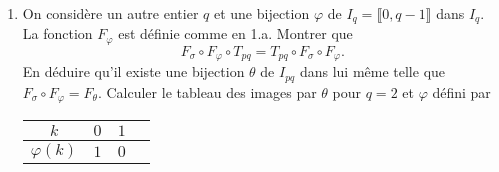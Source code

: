 \begin{enumerate}
\item On considère un autre entier $q$ et une bijection $\varphi$ de $I_q= \llbracket 0, q-1 \rrbracket$ dans $I_q$. La fonction $F_\varphi$ est définie comme en 1.a. Montrer que 
\begin{displaymath}
 F_\sigma \circ F_\varphi \circ T_{pq} = T_{pq} \circ F_\sigma \circ F_\varphi. 
\end{displaymath}
En déduire qu'il existe une bijection $\theta$ de $I_{pq}$ dans lui même telle que $F_\sigma \circ F_\varphi = F_\theta$.\newline
Calculer le tableau des images par $\theta$ pour $q=2$ et $\varphi$ défini par 
\bigskip
\begin{center} \renewcommand{\arraystretch}{1.2}
\begin{tabular}{|c|c|c|c|} \hline
$k$          & $0$ & $1$  \\  \hline
$\varphi(k)$ & $1$ & $0$  \\  \hline
\end{tabular}
\end{center}

\end{enumerate}


